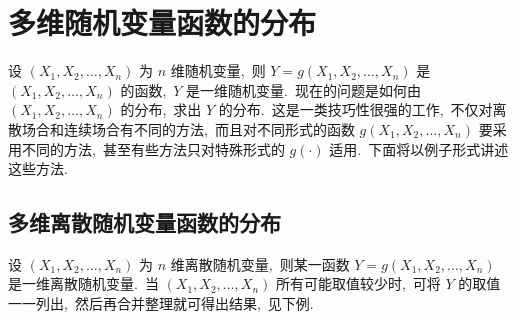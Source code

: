       \section{多维随机变量函数的分布}\label{sec:3.3}
   设 $(X_1,X_2,\ldots,X_n)$ 为 $n$ 维随机变量,\ 则 $Y=g(X_1,X_2,\ldots,X_n)$ 是 $(X_1,X_2,\ldots,X_n)$ 的函数,\ $Y$ 是一维随机变量.\ 现在的问题是如何由 $(X_1,X_2,\ldots,X_n)$ 的分布,\ 求出 $Y$ 的分布.\ 这是一类技巧性很强的工作,\ 不仅对离散场合和连续场合有不同的方法,\ 而且对不同形式的函数 $g(X_1,X_2,\ldots,X_n)$ 要采用不同的方法,\ 甚至有些方法只对特殊形式的 $g(\cdot)$ 适用.\ 下面将以例子形式讲述这些方法.
   \subsection{多维离散随机变量函数的分布}\label{ssec:3.3.1}
   设 $(X_1,X_2,\ldots,X_n)$ 为 $n$ 维离散随机变量,\ 则某一函数 $Y=g(X_1,X_2,\ldots,X_n)$ 是一维离散随机变量.\ 当 $(X_1,X_2,\ldots,X_n)$ 所有可能取值较少时,\ 可将 $Y$ 的取值一一列出,\ 然后再合并整理就可得出结果,\ 见下例.
